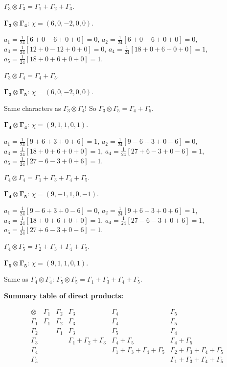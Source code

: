\documentclass[12pt]{article}
\begin{document}
$\Gamma_3 \otimes \Gamma_3 = \Gamma_1 + \Gamma_2 + \Gamma_3$.

\medskip
\noindent$\boldsymbol{\Gamma_3 \otimes \Gamma_4}$: $\chi = (6, 0, -2, 0, 0)$.

$a_1 = \frac{1}{24}[6 + 0 - 6 + 0 + 0] = 0$, $a_2 = \frac{1}{24}[6 + 0 - 6 + 0 + 0] = 0$, $a_3 = \frac{1}{24}[12 + 0 - 12 + 0 + 0] = 0$, $a_4 = \frac{1}{24}[18 + 0 + 6 + 0 + 0] = 1$, $a_5 = \frac{1}{24}[18 + 0 + 6 + 0 + 0] = 1$.

$\Gamma_3 \otimes \Gamma_4 = \Gamma_4 + \Gamma_5$.

\medskip
\noindent$\boldsymbol{\Gamma_3 \otimes \Gamma_5}$: $\chi = (6, 0, -2, 0, 0)$.

Same characters as $\Gamma_3 \otimes \Gamma_4$! So $\Gamma_3 \otimes \Gamma_5 = \Gamma_4 + \Gamma_5$.

\medskip
\noindent$\boldsymbol{\Gamma_4 \otimes \Gamma_4}$: $\chi = (9, 1, 1, 0, 1)$.

$a_1 = \frac{1}{24}[9 + 6 + 3 + 0 + 6] = 1$, $a_2 = \frac{1}{24}[9 - 6 + 3 + 0 - 6] = 0$, $a_3 = \frac{1}{24}[18 + 0 + 6 + 0 + 0] = 1$, $a_4 = \frac{1}{24}[27 + 6 - 3 + 0 - 6] = 1$, $a_5 = \frac{1}{24}[27 - 6 - 3 + 0 + 6] = 1$.

$\Gamma_4 \otimes \Gamma_4 = \Gamma_1 + \Gamma_3 + \Gamma_4 + \Gamma_5$.

\medskip
\noindent$\boldsymbol{\Gamma_4 \otimes \Gamma_5}$: $\chi = (9, -1, 1, 0, -1)$.

$a_1 = \frac{1}{24}[9 - 6 + 3 + 0 - 6] = 0$, $a_2 = \frac{1}{24}[9 + 6 + 3 + 0 + 6] = 1$, $a_3 = \frac{1}{24}[18 + 0 + 6 + 0 + 0] = 1$, $a_4 = \frac{1}{24}[27 - 6 - 3 + 0 + 6] = 1$, $a_5 = \frac{1}{24}[27 + 6 - 3 + 0 - 6] = 1$.

$\Gamma_4 \otimes \Gamma_5 = \Gamma_2 + \Gamma_3 + \Gamma_4 + \Gamma_5$.

\medskip
\noindent$\boldsymbol{\Gamma_5 \otimes \Gamma_5}$: $\chi = (9, 1, 1, 0, 1)$.

Same as $\Gamma_4 \otimes \Gamma_4$: $\Gamma_5 \otimes \Gamma_5 = \Gamma_1 + \Gamma_3 + \Gamma_4 + \Gamma_5$.

\medskip
\noindent\textbf{Summary table of direct products:}

\[
\begin{array}{c|ccccc}
\otimes & \Gamma_1 & \Gamma_2 & \Gamma_3 & \Gamma_4 & \Gamma_5 \\
\hline
\Gamma_1 & \Gamma_1 & \Gamma_2 & \Gamma_3 & \Gamma_4 & \Gamma_5 \\
\Gamma_2 & & \Gamma_1 & \Gamma_3 & \Gamma_5 & \Gamma_4 \\
\Gamma_3 & & & \Gamma_1{+}\Gamma_2{+}\Gamma_3 & \Gamma_4{+}\Gamma_5 & \Gamma_4{+}\Gamma_5 \\
\Gamma_4 & & & & \Gamma_1{+}\Gamma_3{+}\Gamma_4{+}\Gamma_5 & \Gamma_2{+}\Gamma_3{+}\Gamma_4{+}\Gamma_5 \\
\Gamma_5 & & & & & \Gamma_1{+}\Gamma_3{+}\Gamma_4{+}\Gamma_5
\end{array}
\]
\end{document}
